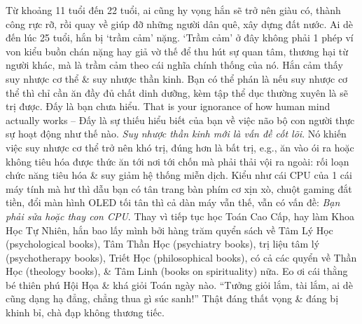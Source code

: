 \documentclass[12pt,oneside]{book}
\begin{document}
Từ khoảng 11 tuổi đến 22 tuổi, ai cũng hy vọng hắn sẽ trở nên giàu có, thành công rực rỡ, rồi quay về giúp đỡ những người dân quê, xây dựng đất nước. Ai dè đến lúc 25 tuổi, hắn bị `trầm cảm' nặng. `Trầm cảm' ở đây không phải 1 phép ví von kiểu buồn chán nặng hay giả vờ thế để thu hút sự quan tâm, thương hại từ người khác, mà là trầm cảm theo cái nghĩa chính thống của nó. Hắn cảm thấy suy nhược cơ thể \& suy nhược thần kinh. Bạn có thể phán là nếu suy nhược cơ thể thì chỉ cần ăn đầy đủ chất dinh dưỡng, kèm tập thể dục thường xuyên là sẽ trị được. Đấy là bạn chưa hiểu. That is your ignorance of how human mind actually works -- Đấy là sự thiếu hiểu biết của bạn về việc não bộ con người thực sự hoạt động như thế nào. {\it Suy nhược thần kinh mới là vấn đề cốt lõi}. Nó khiến việc suy nhược cơ thể trở nên khó trị, đúng hơn là bất trị, e.g., ăn vào ói ra hoặc không tiêu hóa được thức ăn tới nơi tới chốn mà phải thải vội ra ngoài: rối loạn chức năng tiêu hóa \& suy giảm hệ thống miễn dịch. Kiểu như cái CPU của 1 cái máy tính mà hư thì dẫu bạn có tân trang bàn phím cơ xịn xò, chuột gaming đắt tiền, đổi màn hình OLED tối tân thì cả dàn máy vẫn thế, vẫn có vấn đề: {\it Bạn phải sửa hoặc thay con CPU}. Thay vì tiếp tục học Toán Cao Cấp, hay làm Khoa Học Tự Nhiên, hắn bao lấy mình bởi hàng trăm quyển sách về Tâm Lý Học (psychological books), Tâm Thần Học (psychiatry books), trị liệu tâm lý (psychotherapy books), Triết Học (philosophical books), có cả các quyển về Thần Học (theology books), \& Tâm Linh (books on spirituality) nữa. Eo ơi cái thằng bé thiên phú Hội Họa \& khá giỏi Toán ngày nào. ``Tưởng giỏi lắm, tài lắm, ai dè cũng dạng hạ đẳng, chẳng thua gì súc sanh!'' Thật đáng thất vọng \& đáng bị khinh bỉ, chà đạp không thương tiếc.
\end{document}
